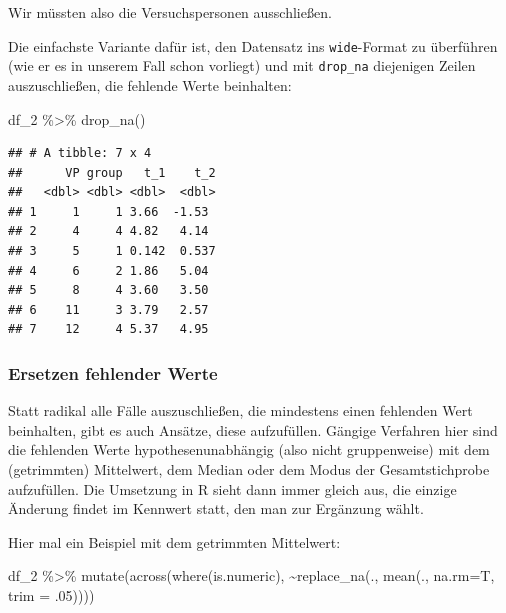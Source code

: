 \documentclass[
]{book}
\newenvironment{Shaded}{\begin{snugshade}}{\end{snugshade}}
\newcommand{\AttributeTok}[1]{\textcolor[rgb]{0.77,0.63,0.00}{#1}}
\newcommand{\DecValTok}[1]{\textcolor[rgb]{0.00,0.00,0.81}{#1}}
\newcommand{\FunctionTok}[1]{\textcolor[rgb]{0.00,0.00,0.00}{#1}}
\newcommand{\NormalTok}[1]{#1}
\newcommand{\SpecialCharTok}[1]{\textcolor[rgb]{0.00,0.00,0.00}{#1}}
\begin{document}
Wir müssten also die Versuchspersonen ausschließen.

Die einfachste Variante dafür ist, den Datensatz ins \texttt{wide}-Format zu überführen (wie er es in unserem Fall schon vorliegt) und mit \texttt{drop\_na} diejenigen Zeilen auszuschließen, die fehlende Werte beinhalten:

\begin{Shaded}
\begin{Highlighting}[]
\NormalTok{df\_2 }\SpecialCharTok{\%\textgreater{}\%} 
  \FunctionTok{drop\_na}\NormalTok{()}
\end{Highlighting}
\end{Shaded}

\begin{verbatim}
## # A tibble: 7 x 4
##      VP group   t_1    t_2
##   <dbl> <dbl> <dbl>  <dbl>
## 1     1     1 3.66  -1.53 
## 2     4     4 4.82   4.14 
## 3     5     1 0.142  0.537
## 4     6     2 1.86   5.04 
## 5     8     4 3.60   3.50 
## 6    11     3 3.79   2.57 
## 7    12     4 5.37   4.95
\end{verbatim}

\hypertarget{ersetzen-fehlender-werte}{%
\subsubsection{Ersetzen fehlender Werte}\label{ersetzen-fehlender-werte}}

Statt radikal alle Fälle auszuschließen, die mindestens einen fehlenden Wert beinhalten, gibt es auch Ansätze, diese aufzufüllen.
Gängige Verfahren hier sind die fehlenden Werte hypothesenunabhängig (also nicht gruppenweise) mit dem (getrimmten) Mittelwert, dem Median oder dem Modus der Gesamtstichprobe aufzufüllen. Die Umsetzung in R sieht dann immer gleich aus, die einzige Änderung findet im Kennwert statt, den man zur Ergänzung wählt.

Hier mal ein Beispiel mit dem getrimmten Mittelwert:

\begin{Shaded}
\begin{Highlighting}[]
\NormalTok{df\_2 }\SpecialCharTok{\%\textgreater{}\%} 
  \FunctionTok{mutate}\NormalTok{(}\FunctionTok{across}\NormalTok{(}\FunctionTok{where}\NormalTok{(is.numeric), }
                \SpecialCharTok{\textasciitilde{}}\FunctionTok{replace\_na}\NormalTok{(., }
                            \FunctionTok{mean}\NormalTok{(.,}
                                 \AttributeTok{na.rm=}\NormalTok{T,}
                                 \AttributeTok{trim =}\NormalTok{ .}\DecValTok{05}\NormalTok{))))}
\end{Highlighting}
\end{Shaded}
\end{document}
